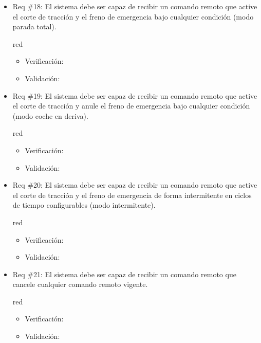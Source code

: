 \documentclass[11pt]{charter}
\begin{document}
\begin{itemize}
\item Req \#18:  El sistema debe ser capaz de recibir un comando remoto que active el corte de tracción y el freno de emergencia bajo cualquier condición (modo parada total).
\begin{consigna}{red}
\begin{itemize}
  \item Verificación:\\
  \item Validación:\\
\end{itemize}
\end{consigna}

\item Req \#19: El sistema debe ser capaz de recibir un comando remoto que active el corte de tracción y anule el freno de emergencia bajo cualquier condición (modo coche en deriva).
\begin{consigna}{red}
\begin{itemize}
  \item Verificación:\\
  \item Validación:\\
\end{itemize}
\end{consigna}

\item Req \#20: El sistema debe ser capaz de recibir un comando remoto que active el corte de tracción y el freno de emergencia de forma intermitente en ciclos de tiempo configurables (modo intermitente).
\begin{consigna}{red}
\begin{itemize}
  \item Verificación:\\
  \item Validación:\\
\end{itemize}
\end{consigna}

\item Req \#21: El sistema debe ser capaz de recibir un comando remoto que cancele cualquier comando remoto vigente.
\begin{consigna}{red}
\begin{itemize}
  \item Verificación:\\
  \item Validación:\\
\end{itemize}
\end{consigna}


\end{itemize}
\end{document}
